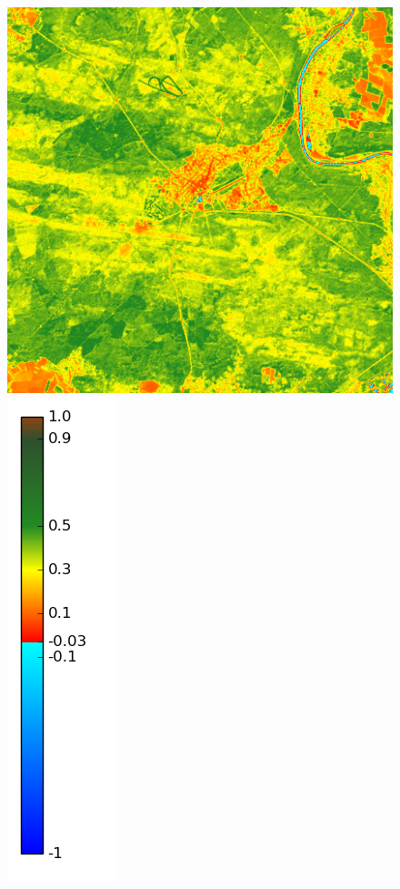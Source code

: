 \documentclass{book}
\begin{document}
\begin{figure}[H]
{\includegraphics[scale=0.25]{images/Fontainebleau/09_ndvi.png}
\includegraphics[scale=0.2]{images/colormap.png}
}
\end{figure}
\end{document}
